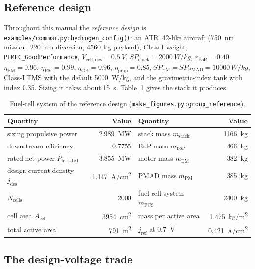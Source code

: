 \documentclass[a4paper,11pt]{article}
\newcommand{\code}[1]{\nolinkurl{#1}}
\newcommand{\fn}[1]{\nolinkurl{#1}}
\newcommand{\jdes}{j_\mathrm{des}}
\newcommand{\Vdes}{V_\mathrm{cell,des}}
\begin{document}
\subsection{Reference design}
\label{sec:refdesign}

Throughout this manual the \emph{reference design} is
\fn{examples/common.py:hydrogen_config()}: an ATR~42-like aircraft (750~nm mission,
220~nm diversion, \SI{4560}{kg} payload), Class-I weight, \code{PEMFC_GoodPerformance},
$\Vdes=\SI{0.5}{V}$, $SP_\mathrm{stack}=\SI{2000}{W/kg}$, $r_\mathrm{BoP}=0.40$,
$\eta_\mathrm{EM}=0.96$, $\eta_\mathrm{PM}=0.99$, $\eta_\mathrm{GB}=0.96$,
$\eta_\mathrm{prop}=0.85$, $SP_\mathrm{EM}=SP_\mathrm{PMAD}=\SI{10000}{W/kg}$, Class-I TMS
with the default \SI{5000}{W/kg}, and the gravimetric-index tank with index 0.35. Sizing it
takes about \SI{15}{s}. Table~\ref{tab:refdesign} gives the stack it produces.

\begin{table}[ht]
\centering\small
\caption{Fuel-cell system of the reference design (\fn{make_figures.py:group_reference}).}
\label{tab:refdesign}
\begin{tabular}{@{}lr@{\hspace{2.5em}}lr@{}}
\toprule
Quantity & Value & Quantity & Value \\
\midrule
sizing propulsive power & \SI{2.989}{MW} & stack mass $m_\mathrm{stack}$ & \SI{1166}{kg} \\
downstream efficiency & 0.7755 & BoP mass $m_\mathrm{BoP}$ & \SI{466}{kg} \\
rated net power $P_\mathrm{fc,rated}$ & \SI{3.855}{MW} & motor mass $m_\mathrm{EM}$ & \SI{382}{kg} \\
design current density $\jdes$ & \SI{1.147}{A/cm^2} & PMAD mass $m_\mathrm{PM}$ & \SI{385}{kg} \\
$N_\mathrm{cells}$ & 2000 & fuel-cell system $m_\mathrm{FCS}$ & \SI{2400}{kg} \\
cell area $A_\mathrm{cell}$ & \SI{3954}{cm^2} & mass per active area & \SI{1.475}{kg/m^2} \\
total active area & \SI{791}{m^2} & $j_\mathrm{ref}$ at \SI{0.7}{V} & \SI{0.421}{A/cm^2} \\
\bottomrule
\end{tabular}
\end{table}

\subsection{The design-voltage trade}
\label{sec:vsweep}
\end{document}
